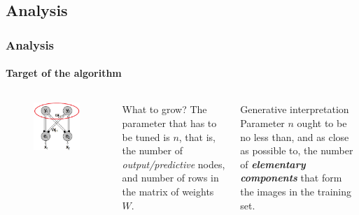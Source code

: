\documentclass{beamer}
\begin{document}
		\subsection{Analysis}
			\begin{frame}
				\frametitle{Analysis}
				\framesubtitle{Target of the algorithm}
				\begin{columns}[c]
						\begin{figure}[h]
							\centering
							\includegraphics[width=\textwidth]{dim_predictive}
						\end{figure}
						\begin{block}{What to grow?}
							The parameter that has to be tuned is $n$, that is, the number of \emph{output/predictive} nodes, and number of rows in the matrix of weights $W$.
						\end{block}
						\begin{exampleblock}{Generative interpretation}
							Parameter $n$ ought to be no less than, and as close as possible to, the number of \emph{\textbf{elementary components}} that form the images in the training set.
						\end{exampleblock}
				\end{columns}
			\end{frame}
		
\end{document}
